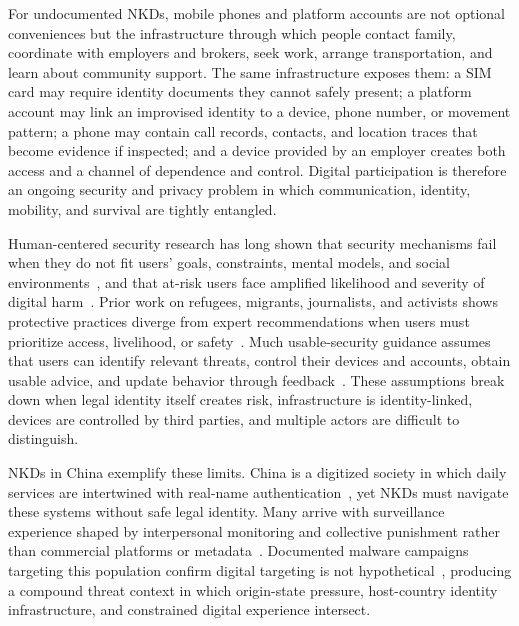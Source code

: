 \documentclass[conference,compsoc]{IEEEtran}
\begin{document}
For undocumented NKDs, mobile phones and platform accounts are not optional conveniences but the infrastructure through which people contact family, coordinate with employers and brokers, seek work, arrange transportation, and learn about community support. The same infrastructure exposes them: a SIM card may require identity documents they cannot safely present; a platform account may link an improvised identity to a device, phone number, or movement pattern; a phone may contain call records, contacts, and location traces that become evidence if inspected; and a device provided by an employer creates both access and a channel of dependence and control. Digital participation is therefore an ongoing security and privacy problem in which communication, identity, mobility, and survival are tightly entangled.

Human-centered security research has long shown that security mechanisms fail when they do not fit users' goals, constraints, mental models, and social environments~\cite{whitten1999johnny,adams1999users,wash2010folk,krombholz2019if}, and that at-risk users face amplified likelihood and severity of digital harm~\cite{warford2022sok}. Prior work on refugees, migrants, journalists, and activists shows protective practices diverge from expert recommendations when users must prioritize access, livelihood, or safety~\cite{simko2018computer,mcgregor2017weakest,sambasivan2018privacy,tran2024security}. Much usable-security guidance assumes that users can identify relevant threats, control their devices and accounts, obtain usable advice, and update behavior through feedback~\cite{wash2010folk,krombholz2019if,herley2009so,redmiles2020comprehensive}. These assumptions break down when legal identity itself creates risk, infrastructure is identity-linked, devices are controlled by third parties, and multiple actors are difficult to distinguish.

NKDs in China exemplify these limits. China is a digitized society in which daily services are intertwined with real-name authentication~\cite{kim2018china}, yet NKDs must navigate these systems without safe legal identity. Many arrive with surveillance experience shaped by interpersonal monitoring and collective punishment rather than commercial platforms or metadata~\cite{warf2015hermit,lankov2014north}. Documented malware campaigns targeting this population confirm digital targeting is not hypothetical~\cite{klingner2021north}, producing a compound threat context in which origin-state pressure, host-country identity infrastructure, and constrained digital experience intersect.
\end{document}
